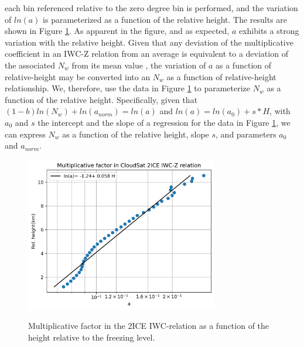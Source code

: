 \documentclass{ametsocV6.1}
\begin{document}
each bin referenced relative to the zero degree bin is performed, and the variation of $ln(a)$ is parameterized as a function of the
relative height.  The results are shown in Figure \ref{f2}. As apparent in the figure, and as expected, $a$ exhibits a strong variation 
with the relative height. Given that any deviation of the multiplicative coefficient in 
an IWC-Z relation from an average is equivalent to a deviation of the associated $N_w$ from its mean value 
\citep{ferreira2001,delanoe2014}, the variation of $a$ as a function of relative-height may be converted into an $N_w$ 
as a function of relative-height relationship.  We, therefore, use the data in Figure \ref{f2} to parameterize $N_w$ as a 
function of the relative height.  Specifically, given that $(1-b)ln(N_w)+ln(a_{norm})=ln(a)$ and $ln(a)=ln(a_0)+s*H$, with 
$a_0$ and $s$ the intercept and the slope of a regression for the data in Figure \ref{f2}, we 
can express $N_w$ as a function of the relative height, slope $s$, and parameters $a_0$ and $a_{norm}$.

\begin{figure}[t]
    \centering
    \includegraphics[width=0.75\textwidth,angle=0]{fig02.rev.png}\\
    \caption{Multiplicative factor in the 2ICE IWC-relation as a function of the height relative to the freezing level.}\label{f2}
\end{figure}
\end{document}
